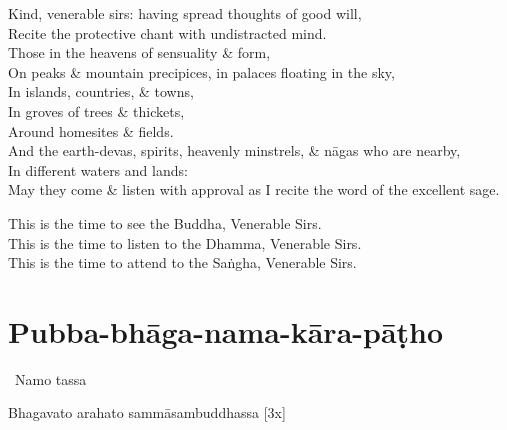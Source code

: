 \begin{leader-yatha}
  Kind, venerable sirs: having spread thoughts of good will,\\
  Recite the protective chant with undistracted mind.\\
  Those in the heavens of sensuality \& form,\\
  On peaks \& mountain precipices, in palaces floating in the sky,\\
  In islands, countries, \& towns,\\
  In groves of trees \& thickets,\\
  Around homesites \& fields.\\
  And the earth-devas, spirits, heavenly minstrels, \& nāgas who are nearby,\\
  In different waters and lands:\\
  May they come \& listen with approval as I recite the word of the excellent sage.

  This is the time to see the Buddha, Venerable Sirs.\\
  This is the time to listen to the Dhamma, Venerable Sirs.\\
  This is the time to attend to the Saṅgha, Venerable Sirs.
\end{leader-yatha}

\suttaRef{[Thai]}

\section{Pubba-bhāga-nama-kāra-pāṭho}
\label{pubba-bhaga-nama-kara-patho-protective}

\begin{pali-leader}
  \anglebracketleft\ \hspace{-0.5mm}Namo tassa \hspace{-0.5mm}\anglebracketright\
\end{pali-leader}
\begin{pali-hangtogether}
Bhagavato arahato sammāsambuddhassa \hfill{[3x]}
\end{pali-hangtogether}

